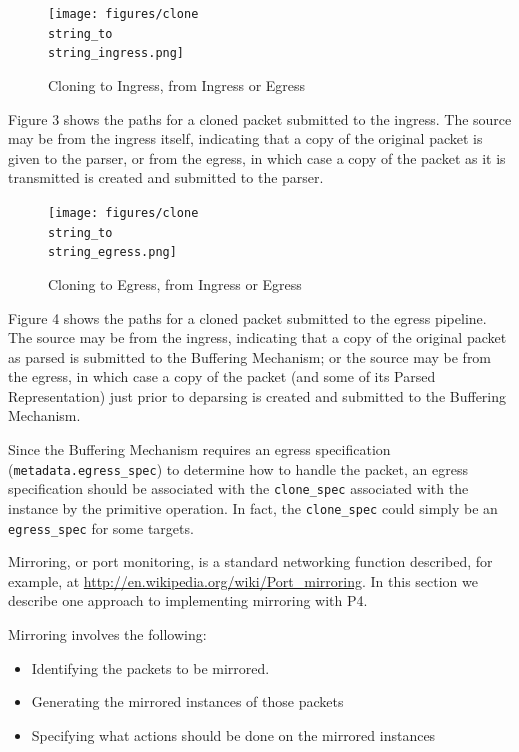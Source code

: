 \documentclass[12pt]{article}
\begin{document}

\begin{figure}[h!]
    \centering
    \texttt{[image: figures/clone\\string\_to\\string\_ingress.png]}
    \caption{Cloning to Ingress, from Ingress or Egress}
    \label{fig:ingressclone}
\end{figure}


Figure 3 shows the paths for a cloned packet submitted to the ingress.  The 
source may be from the ingress itself, indicating that a copy of the original 
packet is given to the parser, or from the egress, in which case a copy of 
the packet as it is transmitted is created and submitted to the parser. 


\begin{figure}[h!]
    \centering
    \texttt{[image: figures/clone\\string\_to\\string\_egress.png]}
    \caption{Cloning to Egress, from Ingress or Egress}
    \label{fig:egressclone}
\end{figure}

Figure 4 shows the paths for a cloned packet submitted to the egress pipeline. 
 The source may be from the ingress, indicating that a copy of the original 
packet as parsed is submitted to the Buffering Mechanism; or the source may 
be from the egress, in which case a copy of the packet (and some of its Parsed 
Representation) just prior to deparsing is created and submitted to the Buffering 
Mechanism. 

Since the Buffering Mechanism requires an egress specification (\texttt{metadata.egress_spec}) 
to determine how to handle the packet, an egress specification should be associated 
with the \texttt{clone_spec} associated with the instance by the primitive operation. 
In fact, the \texttt{clone_spec} could simply be an \texttt{egress_spec} for some targets.


Mirroring, or port monitoring, is a standard networking function described, 
for example, at \url{http://en.wikipedia.org/wiki/Port_mirroring}.
In this section 
we describe one approach to implementing mirroring with P4.

Mirroring involves the following:

\begin{itemize}
\item
Identifying the packets to be mirrored.
\item
Generating the mirrored instances of those packets
\item
Specifying what actions should be done on the mirrored instances
\end{itemize}
\end{document}

